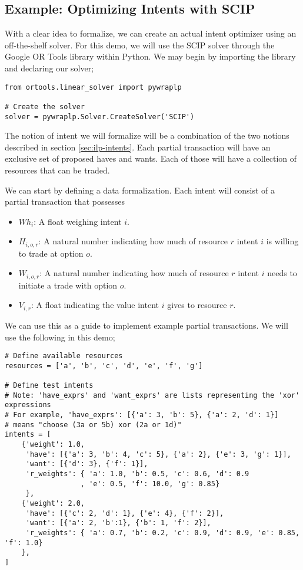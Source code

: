 
\subsection{Example: Optimizing Intents with SCIP}\label{sec:scip-example}

With a clear idea to formalize, we can create an actual intent optimizer using an off-the-shelf solver. For this demo, we will use the SCIP solver through the Google OR Tools library within Python. We may begin by importing the library and declaring our solver;

\begin{verbatim}
from ortools.linear_solver import pywraplp

# Create the solver
solver = pywraplp.Solver.CreateSolver('SCIP')
\end{verbatim}

The notion of intent we will formalize will be a combination of the two notions described in section \ref{sec:ilp-intents}. Each partial transaction will have an exclusive set of proposed haves and wants. Each of those will have a collection of resources that can be traded.

We can start by defining a data formalization. Each intent will consist of a partial transaction that possesses

\begin{itemize}
    \item $Wh_i$: A float weighing intent $i$.
    \item $H_{i, o, r}$: A natural number indicating how much of resource $r$ intent $i$ is willing to trade at option $o$.
    \item $W_{i, o, r}$: A natural number indicating how much of resource $r$ intent $i$ needs to initiate a trade with option $o$.
    \item $V_{i, r}$: A float indicating the value intent $i$ gives to resource $r$.
\end{itemize}

We can use this as a guide to implement example partial transactions. We will use the following in this demo;

\begin{verbatim}
# Define available resources
resources = ['a', 'b', 'c', 'd', 'e', 'f', 'g']

# Define test intents
# Note: 'have_exprs' and 'want_exprs' are lists representing the 'xor' expressions
# For example, 'have_exprs': [{'a': 3, 'b': 5}, {'a': 2, 'd': 1}] 
# means "choose (3a or 5b) xor (2a or 1d)"
intents = [
    {'weight': 1.0, 
     'have': [{'a': 3, 'b': 4, 'c': 5}, {'a': 2}, {'e': 3, 'g': 1}],
     'want': [{'d': 3}, {'f': 1}],
     'r_weights': { 'a': 1.0, 'b': 0.5, 'c': 0.6, 'd': 0.9
                  , 'e': 0.5, 'f': 10.0, 'g': 0.85}
     },
    {'weight': 2.0, 
     'have': [{'c': 2, 'd': 1}, {'e': 4}, {'f': 2}],
     'want': [{'a': 2, 'b':1}, {'b': 1, 'f': 2}],
     'r_weights': { 'a': 0.7, 'b': 0.2, 'c': 0.9, 'd': 0.9, 'e': 0.85, 'f': 1.0}
    },
]
\end{verbatim}

